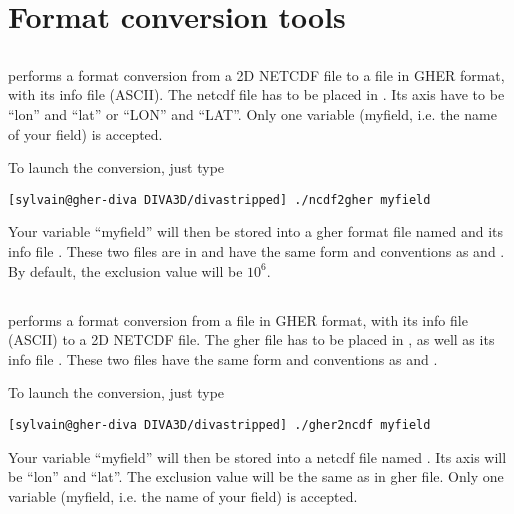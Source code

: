 \section{Format conversion tools}

\subsection{}

 performs a format conversion from a 2D NETCDF file to a file in GHER format, with its info file (ASCII).
The netcdf file  has to be placed in . Its axis have to be ``lon'' and ``lat'' or ``LON'' and ``LAT''.
Only one variable (myfield, i.e. the name of your field) is accepted. 

To launch the conversion, just type 

\begin{lstlisting}[style=Bash]
[sylvain@gher-diva DIVA3D/divastripped] ./ncdf2gher myfield
\end{lstlisting}

Your variable ``myfield'' will then be stored into a gher format file named  and its info file .
These two files are in  and have the same form and conventions as  and .
By default, the exclusion value will be $10^6$.


\subsection{}

 performs a format conversion from a file in GHER format, with its info file (ASCII) to a 2D NETCDF file.
The gher file  has to be placed in , as well as its info file . 
These two files have the same form and conventions as  and . 

To launch the conversion, just type 

\begin{lstlisting}[style=Bash]
[sylvain@gher-diva DIVA3D/divastripped] ./gher2ncdf myfield
\end{lstlisting}

Your variable ``myfield'' will then be stored into a netcdf file named . Its axis will be ``lon'' and ``lat''.
The exclusion value will be the same as in gher file. Only one variable (myfield, i.e. the name of your field) is accepted. 


